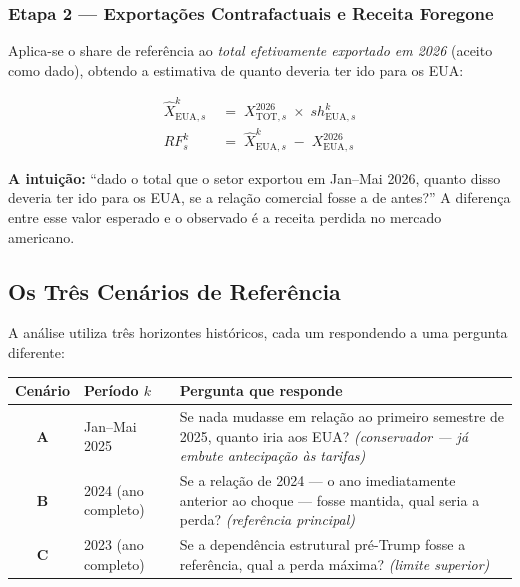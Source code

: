 \documentclass[12pt, a4paper]{article}
\begin{document}
\subsubsection*{Etapa 2 --- Exportações Contrafactuais e Receita Foregone}

Aplica-se o share de referência ao \emph{total efetivamente exportado
em 2026} (aceito como dado), obtendo a estimativa de quanto deveria
ter ido para os EUA:

\begin{formulabox}
\begin{align}
  \hat{X}_{\text{EUA},s}^{k}
    &\;=\; X_{\text{TOT},s}^{2026} \;\times\; sh_{\text{EUA},s}^{k}
    \label{eq:ctf} \\[6pt]
  RF_s^k
    &\;=\; \hat{X}_{\text{EUA},s}^{k} \;-\; X_{\text{EUA},s}^{2026}
    \label{eq:rf}
\end{align}
\end{formulabox}

\noindent\textbf{A intuição:} ``dado o total que o setor exportou em
Jan--Mai 2026, quanto disso deveria ter ido para os EUA, se a relação
comercial fosse a de antes?'' A diferença entre esse valor esperado e
o observado é a receita perdida no mercado americano.

\subsection{Os Três Cenários de Referência}

A análise utiliza três horizontes históricos, cada um respondendo a uma
pergunta diferente:

\begin{center}
\renewcommand{\arraystretch}{1.4}
\begin{tabular}{>{\bfseries}clp{7.5cm}}
\toprule
Cenário & Período $k$ & Pergunta que responde \\
\midrule
A & Jan--Mai 2025
  & Se nada mudasse em relação ao primeiro semestre de 2025, quanto
    iria aos EUA? \emph{(conservador --- já embute antecipação às tarifas)} \\[0.3em]
B & 2024 (ano completo)
  & Se a relação de 2024 --- o ano imediatamente anterior ao choque ---
    fosse mantida, qual seria a perda? \emph{(referência principal)} \\[0.3em]
C & 2023 (ano completo)
  & Se a dependência estrutural pré-Trump fosse a referência, qual a
    perda máxima? \emph{(limite superior)} \\
\bottomrule
\end{tabular}
\end{center}
\end{document}
